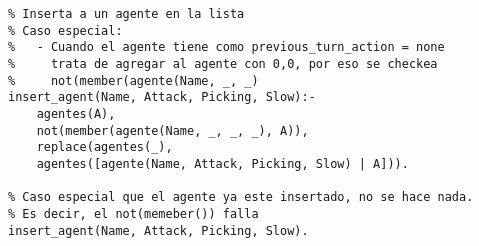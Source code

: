 \documentclass[a4paper,10pt,spanish]{article}
\begin{document}
\begin{lstlisting}
% Inserta a un agente en la lista
% Caso especial: 
%	- Cuando el agente tiene como previous_turn_action = none 
%     trata de agregar al agente con 0,0, por eso se checkea 
%     not(member(agente(Name, _, _)
insert_agent(Name, Attack, Picking, Slow):- 
	agentes(A), 
	not(member(agente(Name, _, _, _), A)), 
	replace(agentes(_), 
	agentes([agente(Name, Attack, Picking, Slow) | A])).

% Caso especial que el agente ya este insertado, no se hace nada.
% Es decir, el not(memeber()) falla
insert_agent(Name, Attack, Picking, Slow).
	\end{lstlisting}

	
\end{document}
